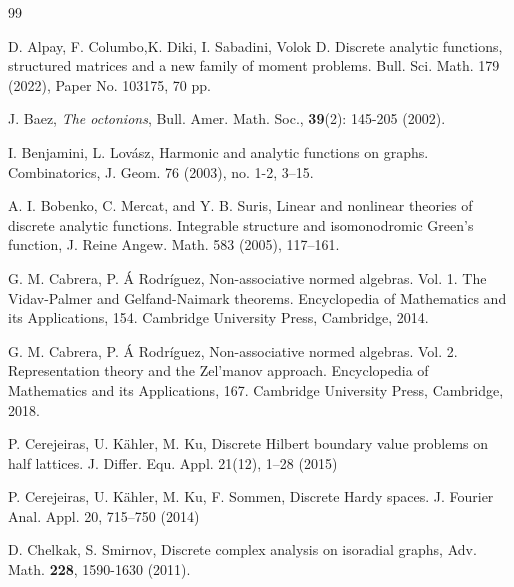 \documentclass{amsart}
\theoremstyle{definition}
\theoremstyle{remark}
\numberwithin{equation}{section}
\begin{document}
\begin{thebibliography}{99}

 D.  Alpay, F. Columbo,K. Diki, I.  Sabadini, Volok D.   Discrete analytic functions, structured matrices and a new family of moment problems. Bull. Sci. Math. 179 (2022), Paper No. 103175, 70 pp.





J. Baez, \emph{The octonions},
Bull. Amer. Math. Soc.,   \textbf{39}(2): 145-205 (2002).







 I. Benjamini,  L. Lov\'asz,   Harmonic and analytic functions on graphs. Combinatorics,   J. Geom. 76 (2003), no. 1-2, 3–15.












A. I. Bobenko, C. Mercat, and Y. B. Suris, Linear and nonlinear theories of discrete analytic
functions. Integrable structure and isomonodromic Green’s function, J. Reine Angew. Math.
583 (2005), 117–161.




    G. M.  Cabrera,   P. \'A Rodríguez,  Non-associative normed algebras. Vol. 1. The Vidav-Palmer and Gelfand-Naimark theorems. Encyclopedia of Mathematics and its Applications, 154. Cambridge University Press, Cambridge, 2014.






     G. M. Cabrera,   P. \'A Rodríguez,  Non-associative normed algebras. Vol. 2. Representation theory and the Zel'manov approach. Encyclopedia of Mathematics and its Applications, 167. Cambridge University Press, Cambridge, 2018.



 P. Cerejeiras, U. K\"ahler, M. Ku,   Discrete Hilbert boundary value problems on half lattices. J. Differ. Equ. Appl. 21(12), 1–28 (2015)




P. Cerejeiras,  U.  K\"ahler, M.  Ku,  F.  Sommen,   Discrete Hardy spaces. J. Fourier Anal. Appl. 20,
715–750 (2014)


    D. Chelkak, S. Smirnov,  { Discrete complex analysis on isoradial   graphs},
     Adv. Math. \textbf{228}, 1590-1630 (2011).



\end{thebibliography}
\end{document}

